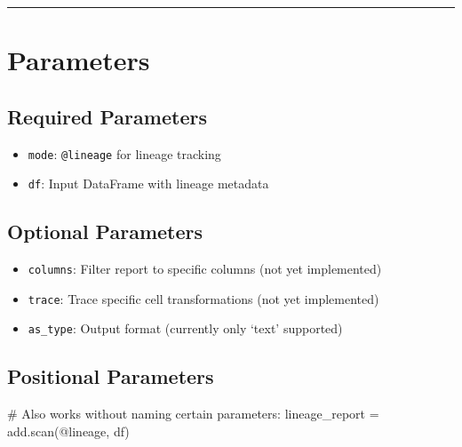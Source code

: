 \documentclass[
  letterpaper,
]{scrbook}
\newenvironment{Shaded}{\begin{snugshade}}{\end{snugshade}}
\newcommand{\CommentTok}[1]{\textcolor[rgb]{0.37,0.37,0.37}{#1}}
\newcommand{\NormalTok}[1]{\textcolor[rgb]{0.00,0.23,0.31}{#1}}
\newcommand{\OperatorTok}[1]{\textcolor[rgb]{0.37,0.37,0.37}{#1}}
\newcommand{\StringTok}[1]{\textcolor[rgb]{0.13,0.47,0.30}{#1}}
\providecommand{\tightlist}{%
  \setlength{\itemsep}{0pt}\setlength{\parskip}{0pt}}
\begin{document}
\begin{center}\rule{0.5\linewidth}{0.5pt}\end{center}

\section{Parameters}\label{parameters-5}

\subsection{Required Parameters}\label{required-parameters-4}

\begin{itemize}
\tightlist
\item
  \texttt{mode}: \texttt{\textquotesingle{}@lineage\textquotesingle{}}
  for lineage tracking
\item
  \texttt{df}: Input DataFrame with lineage metadata
\end{itemize}

\subsection{Optional Parameters}\label{optional-parameters-4}

\begin{itemize}
\tightlist
\item
  \texttt{columns}: Filter report to specific columns (not yet
  implemented)
\item
  \texttt{trace}: Trace specific cell transformations (not yet
  implemented)
\item
  \texttt{as\_type}: Output format (currently only `text' supported)
\end{itemize}

\subsection{Positional Parameters}\label{positional-parameters-5}

\begin{Shaded}
\begin{Highlighting}[]
\CommentTok{\# Also works without naming certain parameters:}
\NormalTok{lineage\_report }\OperatorTok{=}\NormalTok{ add.scan(}\StringTok{\textquotesingle{}@lineage\textquotesingle{}}\NormalTok{, df)}
\end{Highlighting}
\end{Shaded}
\end{document}
